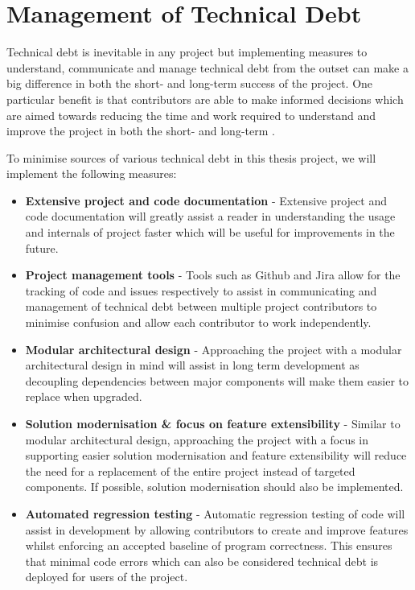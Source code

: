 \documentclass[hidelinks]{report}
\begin{document}
\section{Management of Technical Debt}

Technical debt is inevitable in any project but implementing measures to understand, communicate and manage technical debt from the outset can make a big difference in both the short- and long-term success of the project. One particular benefit is that contributors are able to make informed decisions which are aimed towards reducing the time and work required to understand and improve the project in both the short- and long-term \cite{TechnicalDebtManagement}.

To minimise sources of various technical debt in this thesis project, we will implement the following measures:
\begin{itemize}
	\item \textbf{Extensive project and code documentation} - Extensive project and code documentation will greatly assist a reader in understanding the usage and internals of project faster which will be useful for improvements in the future.
	\item \textbf{Project management tools} - Tools such as Github and Jira allow for the tracking of code and issues respectively to assist in communicating and management of technical debt between multiple project contributors to minimise confusion and allow each contributor to work independently.
	\item \textbf{Modular architectural design} - Approaching the project with a modular architectural design in mind will assist in long term development as decoupling dependencies between major components will make them easier to replace when upgraded.
	\item \textbf{Solution modernisation \& focus on feature extensibility} - Similar to modular architectural design, approaching the project with a focus in supporting easier solution modernisation and feature extensibility will reduce the need for a replacement of the entire project instead of targeted components. If possible, solution modernisation should also be implemented.
	\item \textbf{Automated regression testing} - Automatic regression testing of code will assist in development by allowing contributors to create and improve features whilst enforcing an accepted baseline of program correctness. This ensures that minimal code errors which can also be considered technical debt is deployed for users of the project.
\end{itemize}
\end{document}
